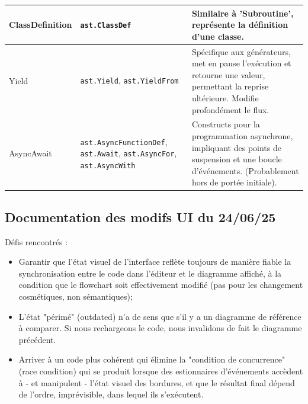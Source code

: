 \documentclass[11pt,a4paper]{article}
\begin{document}
\begin{longtable}{| p{4cm} | p{4cm} | p{7cm} |}
ClassDefinition & \texttt{ast.ClassDef} & Similaire à 'Subroutine', représente la définition d'une classe. \\ \hline
Yield & \texttt{ast.Yield}, \texttt{ast.YieldFrom} & Spécifique aux générateurs, met en pause l'exécution et retourne une valeur, permettant la reprise ultérieure. Modifie profondément le flux. \\ \hline
AsyncAwait & \texttt{ast.AsyncFunctionDef}, \texttt{ast.Await}, \texttt{ast.AsyncFor}, \texttt{ast.AsyncWith} & Constructs pour la programmation asynchrone, impliquant des points de suspension et une boucle d'événements. (Probablement hors de portée initiale). \\ \hline
\end{longtable}

\newpage

\subsection{Documentation des modifs UI du 24/06/25}
Défis rencontrés : \begin{itemize}
    \item Garantir que l'état visuel de l'interface reflète toujours de manière fiable la synchronisation entre le code dans l'éditeur et le diagramme affiché, à la condition que le flowchart soit effectivement modifié (pas pour les changement cosmétiques, non sémantiques); 
    \item L'état "périmé" (outdated) n'a de sens que s'il y a un diagramme de référence à comparer. Si nous rechargeons le code, nous invalidons de fait le diagramme précédent.
    \item Arriver à un code plus cohérent qui élimine la "condition de concurrence" (race condition) qui se produit lorsque des estionnaires d'événements accèdent à - et manipulent - l'état visuel des bordures, et que le résultat final dépend de l'ordre, imprévisible, dans lequel ils s'exécutent. 
\end{itemize}
\end{document}
